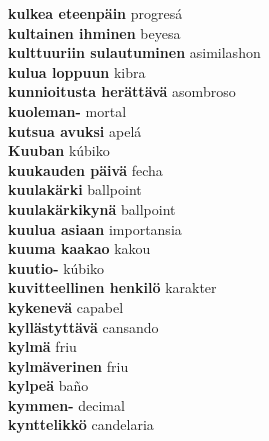 \textbf{ kulkea eteenpäin  } progresá \\
\textbf{ kultainen ihminen  } beyesa \\
\textbf{ kulttuuriin sulautuminen  } asimilashon \\
\textbf{ kulua loppuun  } kibra \\
\textbf{ kunnioitusta herättävä  } asombroso \\
\textbf{ kuoleman-  } mortal \\
\textbf{ kutsua avuksi  } apelá \\
\textbf{ Kuuban  } kúbiko \\
\textbf{ kuukauden päivä  } fecha \\
\textbf{ kuulakärki  } ballpoint \\
\textbf{ kuulakärkikynä  } ballpoint \\
\textbf{ kuulua asiaan  } importansia \\
\textbf{ kuuma kaakao  } kakou \\
\textbf{ kuutio-  } kúbiko \\
\textbf{ kuvitteellinen henkilö  } karakter \\
\textbf{ kykenevä  } capabel \\
\textbf{ kyllästyttävä  } cansando \\
\textbf{ kylmä  } friu \\
\textbf{ kylmäverinen  } friu \\
\textbf{ kylpeä  } baño \\
\textbf{ kymmen-  } decimal \\
\textbf{ kynttelikkö  } candelaria \\
